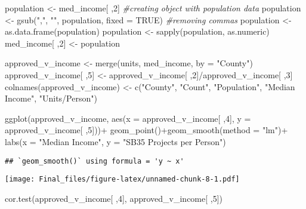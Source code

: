 \documentclass[
]{article}
\newenvironment{Shaded}{\begin{snugshade}}{\end{snugshade}}
\newcommand{\AttributeTok}[1]{\textcolor[rgb]{0.77,0.63,0.00}{#1}}
\newcommand{\CommentTok}[1]{\textcolor[rgb]{0.56,0.35,0.01}{\textit{#1}}}
\newcommand{\ConstantTok}[1]{\textcolor[rgb]{0.00,0.00,0.00}{#1}}
\newcommand{\DecValTok}[1]{\textcolor[rgb]{0.00,0.00,0.81}{#1}}
\newcommand{\FunctionTok}[1]{\textcolor[rgb]{0.00,0.00,0.00}{#1}}
\newcommand{\NormalTok}[1]{#1}
\newcommand{\OtherTok}[1]{\textcolor[rgb]{0.56,0.35,0.01}{#1}}
\newcommand{\SpecialCharTok}[1]{\textcolor[rgb]{0.00,0.00,0.00}{#1}}
\newcommand{\StringTok}[1]{\textcolor[rgb]{0.31,0.60,0.02}{#1}}
\begin{document}
\begin{Shaded}
\begin{Highlighting}[]
\NormalTok{population }\OtherTok{\textless{}{-}}\NormalTok{ med\_income[ ,}\DecValTok{2}\NormalTok{] }\CommentTok{\#creating object with population data}
\NormalTok{population }\OtherTok{\textless{}{-}} \FunctionTok{gsub}\NormalTok{(}\StringTok{","}\NormalTok{, }\StringTok{""}\NormalTok{, population, }\AttributeTok{fixed =} \ConstantTok{TRUE}\NormalTok{) }\CommentTok{\#removing commas}
\NormalTok{population }\OtherTok{\textless{}{-}} \FunctionTok{as.data.frame}\NormalTok{(population)}
\NormalTok{population }\OtherTok{\textless{}{-}} \FunctionTok{sapply}\NormalTok{(population, as.numeric)}
\NormalTok{med\_income[ ,}\DecValTok{2}\NormalTok{] }\OtherTok{\textless{}{-}}\NormalTok{ population}

\NormalTok{approved\_v\_income }\OtherTok{\textless{}{-}} \FunctionTok{merge}\NormalTok{(units, med\_income, }\AttributeTok{by =} \StringTok{"County"}\NormalTok{)}
\NormalTok{approved\_v\_income[ ,}\DecValTok{5}\NormalTok{] }\OtherTok{\textless{}{-}}\NormalTok{ approved\_v\_income[ ,}\DecValTok{2}\NormalTok{]}\SpecialCharTok{/}\NormalTok{approved\_v\_income[ ,}\DecValTok{3}\NormalTok{]}
\FunctionTok{colnames}\NormalTok{(approved\_v\_income) }\OtherTok{\textless{}{-}} \FunctionTok{c}\NormalTok{(}\StringTok{"County"}\NormalTok{, }\StringTok{"Count"}\NormalTok{, }\StringTok{"Population"}\NormalTok{, }\StringTok{"Median Income"}\NormalTok{, }\StringTok{"Units/Person"}\NormalTok{)}

\FunctionTok{ggplot}\NormalTok{(approved\_v\_income, }\FunctionTok{aes}\NormalTok{(}\AttributeTok{x =}\NormalTok{ approved\_v\_income[ ,}\DecValTok{4}\NormalTok{], }\AttributeTok{y =}\NormalTok{ approved\_v\_income[ ,}\DecValTok{5}\NormalTok{]))}\SpecialCharTok{+}
  \FunctionTok{geom\_point}\NormalTok{()}\SpecialCharTok{+}\FunctionTok{geom\_smooth}\NormalTok{(}\AttributeTok{method =} \StringTok{"lm"}\NormalTok{)}\SpecialCharTok{+}
  \FunctionTok{labs}\NormalTok{(}\AttributeTok{x =} \StringTok{"Median Income"}\NormalTok{, }\AttributeTok{y =} \StringTok{"SB35 Projects per Person"}\NormalTok{)}
\end{Highlighting}
\end{Shaded}

\begin{verbatim}
## `geom_smooth()` using formula = 'y ~ x'
\end{verbatim}

\texttt{[image: Final\_files/figure-latex/unnamed-chunk-8-1.pdf]}

\begin{Shaded}
\begin{Highlighting}[]
\FunctionTok{cor.test}\NormalTok{(approved\_v\_income[ ,}\DecValTok{4}\NormalTok{], approved\_v\_income[ ,}\DecValTok{5}\NormalTok{])}
\end{Highlighting}
\end{Shaded}
\end{document}
